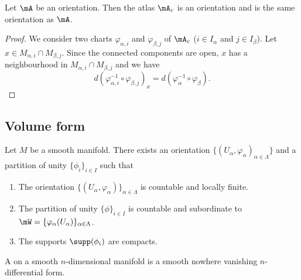 \begin{proposition}		\label{PROPooHQSSooDCjlIX}
	Let \( \mA\) be an orientation. Then the atlas \( \mA_c\) is an orientation and is the same orientation as \( \mA\).
\end{proposition}

\begin{proof}
	We consider two charts \( \varphi_{\alpha,i}\) and \( \varphi_{\beta,j}\) of \( \mA_c\) (\( i\in I_{\alpha}\) and \( j\in I_{\beta}\)). Let \( x\in M_{\alpha,i}\cap M_{\beta,j}\). Since the connected components are open, \( x\) has a neighbourhood in \( M_{\alpha,i}\cap M_{\beta,j}\) and we have
	\begin{equation}
		d(\varphi_{\alpha,i}^{-1}\circ\varphi_{\beta,j})_x=d(\varphi_{\alpha}^{-1}\circ \varphi_{\beta}).
	\end{equation}
\end{proof}

\subsection{Volume form}

\begin{proposition}		\label{PROPooBIVHooXOycnS}
	Let \( M\) be a smooth manifold. There exists an orientation \( \{ (U_{\alpha},\varphi_{\alpha})_{\alpha\in \Lambda} \}\) and a partition of unity \( \{ \phi_i \}_{i\in I}\) such that
	\begin{enumerate}
		\item
		      The orientation \( \{ (U_{\alpha},\varphi_{\alpha}) \}_{\alpha\in \Lambda}\) is countable and locally finite.
		\item
		      The partition of unity \( \{ \phi \}_{i\in I}\)  is countable and subordinate to \( \mW=\{ \varphi_{\alpha}(U_{\alpha}) \}_{\alpha\in \Lambda}\).
		\item
		      The supports \( \supp(\phi_i)\) are compacts.
	\end{enumerate}
\end{proposition}

\begin{definition}			\label{DEFooOBZEooMZauZF}
	A  on a smooth \(n \)-dimensional manifold is a smooth nowhere vanishing \( n\)-differential form.
\end{definition}

